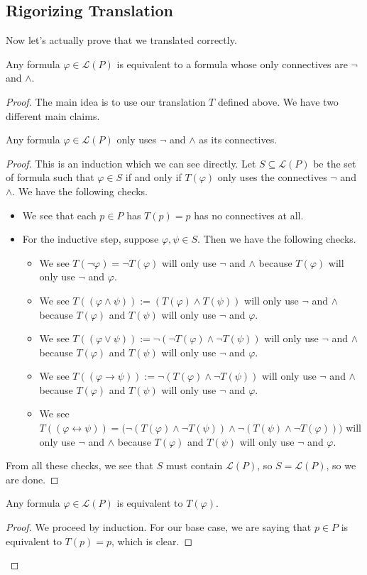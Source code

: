\subsection{Rigorizing Translation}
Now let's actually prove that we translated correctly.
\begin{theorem}
	Any formula $\varphi\in\mathcal L(P)$ is equivalent to a formula whose only connectives are $\lnot$ and $\land$.
\end{theorem}
\begin{proof}
	The main idea is to use our translation $T$ defined above. We have two different main claims.
	\begin{lemma}
		Any formula $\varphi\in\mathcal L(P)$ only uses $\lnot$ and $\land$ as its connectives.
	\end{lemma}
	\begin{proof}
		This is an induction which we can see directly. Let $S\subseteq\mathcal L(P)$ be the set of formula such that $\varphi\in S$ if and only if $T(\varphi)$ only uses the connectives $\lnot$ and $\land$. We have the following checks.
		\begin{itemize}
			\item We see that each $p\in P$ has $T(p)=p$ has no connectives at all.
			\item For the inductive step, suppose $\varphi,\psi\in S$. Then we have the following checks.
			\begin{itemize}
				\item We see $T(\lnot\varphi)=\lnot T(\varphi)$ will only use $\lnot$ and $\land$ because $T(\varphi)$ will only use $\lnot$ and $\varphi$.
				\item We see $T((\varphi\land\psi)):=(T(\varphi)\land T(\psi))$ will only use $\lnot$ and $\land$ because $T(\varphi)$ and $T(\psi)$ will only use $\lnot$ and $\varphi$.
				\item We see $T((\varphi\lor\psi)):=\lnot(\lnot T(\varphi)\land\lnot T(\psi))$ will only use $\lnot$ and $\land$ because $T(\varphi)$ and $T(\psi)$ will only use $\lnot$ and $\varphi$.
				\item We see $T((\varphi\to\psi)):=\lnot(T(\varphi)\land\lnot T(\psi))$ will only use $\lnot$ and $\land$ because $T(\varphi)$ and $T(\psi)$ will only use $\lnot$ and $\varphi$.
				\item We see $T((\varphi\leftrightarrow\psi))=\big(\lnot(T(\varphi)\land\lnot T(\psi))\land\lnot(T(\psi)\land\lnot T(\varphi))\big)$ will only use $\lnot$ and $\land$ because $T(\varphi)$ and $T(\psi)$ will only use $\lnot$ and $\varphi$.
			\end{itemize}
		\end{itemize}
		From all these checks, we see that $S$ must contain $\mathcal L(P)$, so $S=\mathcal L(P)$, so we are done.
	\end{proof}
	\begin{lemma}
		Any formula $\varphi\in\mathcal L(P)$ is equivalent to $T(\varphi)$.
	\end{lemma}
	\begin{proof}
		We proceed by induction. For our base case, we are saying that $p\in P$ is equivalent to $T(p)=p$, which is clear.


\end{proof}
\end{proof}
